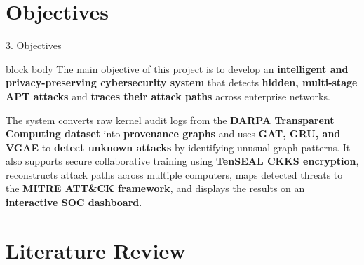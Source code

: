\documentclass[aspectratio=169,10pt]{beamer}
\begin{document}
\section{Objectives}

\begin{frame}{3. Objectives}
\vspace{0.6em}
\begin{beamercolorbox}[rounded=true,shadow=false,sep=0.80em,wd=\textwidth]{block body}
\fontsize{9.2pt}{14.5pt}\selectfont
The main objective of this project is to develop an \textbf{intelligent and privacy-preserving cybersecurity system} that detects \textbf{hidden, multi-stage APT attacks} and \textbf{traces their attack paths} across enterprise networks.

\vspace{0.4em}
The system converts raw kernel audit logs from the \textbf{DARPA Transparent Computing dataset} into \textbf{provenance graphs} and uses \textbf{GAT, GRU, and VGAE} to \textbf{detect unknown attacks} by identifying unusual graph patterns. It also supports secure collaborative training using \textbf{TenSEAL CKKS encryption}, reconstructs attack paths across multiple computers, maps detected threats to the \textbf{MITRE ATT\&CK framework}, and displays the results on an \textbf{interactive SOC dashboard}.
\end{beamercolorbox}
\end{frame}

\section{Literature Review}
\end{document}
